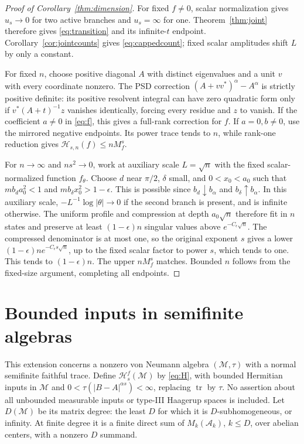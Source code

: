 \documentclass[11pt]{article}
\numberwithin{equation}{section}
\newcommand{\tr}{\operatorname{tr}}
\newcommand{\cH}{\mathcal H}
\begin{document}
\begin{proof}[Proof of Corollary~\ref{thm:dimension}]
For fixed $f\ne0$, scalar normalization gives $u_s\to0$ for two
active branches and $u_s=\infty$ for one. Theorem~\ref{thm:joint}
therefore gives \eqref{eq:transition} and its infinite-$t$ endpoint.
Corollary~\ref{cor:jointcounts} gives \eqref{eq:cappedcount}; fixed
scalar amplitudes shift $L$ by only a constant.

For fixed $n$, choose positive diagonal $A$ with distinct eigenvalues
and a unit $v$ with every coordinate nonzero. The PSD correction
$(A+vv^*)^\alpha-A^\alpha$ is strictly positive definite: its positive
resolvent integral can have zero quadratic form only if
$v^*(A+t)^{-1}z$ vanishes identically, forcing every residue and $z$
to vanish. If the coefficient $a\ne0$ in \eqref{eq:f}, this gives a
full-rank correction for $f$. If $a=0,b\ne0$, use the mirrored
negative endpoints. Its power trace tends to $n$, while rank-one
reduction gives $\cH_{s,n}(f)\le nM_f^s$.

For $n\to\infty$ and $n s^2\to0$, work at auxiliary scale
$L=\sqrt n$ with the fixed scalar-normalized function $f_\theta$.
Choose $d$ near $\pi/2$, $\delta$ small, and $0<x_0<a_0$ such that
$m b_d a_0^2<1$ and $m b_\delta x_0^2>1-\epsilon$.
This is possible since $b_d\downarrow b_\alpha$ and
$b_\delta\uparrow b_\alpha$. In this auxiliary scale,
$-L^{-1}\log|\theta|\to0$ if the second branch is present, and is
infinite otherwise. The uniform profile and compression at depth
$a_0\sqrt n$ therefore fit in $n$ states and preserve at least
$(1-\epsilon)n$ singular values above $e^{-C_\epsilon\sqrt n}$.
The compressed denominator is at most one, so the original exponent
$s$ gives a lower
$(1-\epsilon)n e^{-C_\epsilon s\sqrt n}$, up to the fixed scalar
factor to power $s$, which tends to one. This tends to
$(1-\epsilon)n$. The upper $nM_f^s$ matches. Bounded $n$ follows
from the fixed-size argument, completing all endpoints.
\end{proof}

\section{Bounded inputs in semifinite algebras}

This extension concerns a nonzero von Neumann algebra $(\mathcal M,\tau)$
with a normal semifinite faithful trace. Define $\cH_s^f(\mathcal M)$
by \eqref{eq:H}, with bounded Hermitian inputs in $\mathcal M$ and
$0<\tau(|B-A|^{\alpha s})<\infty$, replacing $\tr$ by $\tau$.
No assertion about all unbounded measurable inputs or type-III
Haagerup spaces is included. Let $D(\mathcal M)$ be its matrix degree:
the least $D$ for which it is $D$-subhomogeneous, or infinity.
At finite degree it is a finite direct sum of
$M_k(\mathcal A_k)$, $k\le D$, over abelian centers, with a nonzero
$D$ summand.
\end{document}
